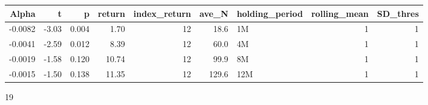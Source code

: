 \begin{table}[ht]
\centering
\begin{tabular}{rrrrrrlrr}
  \hline
Alpha & t & p & return & index\_return & ave\_N & holding\_period & rolling\_mean & SD\_thres \\ 
  \hline
-0.0082 & -3.03 & 0.004 & 1.70 & 12 & 18.6 & 1M &  1 &  1 \\ 
  -0.0041 & -2.59 & 0.012 & 8.39 & 12 & 60.0 & 4M &  1 &  1 \\ 
  -0.0019 & -1.58 & 0.120 & 10.74 & 12 & 99.9 & 8M &  1 &  1 \\ 
  -0.0015 & -1.50 & 0.138 & 11.35 & 12 & 129.6 & 12M &  1 &  1 \\ 
   \hline
\end{tabular}
\end{table}
19